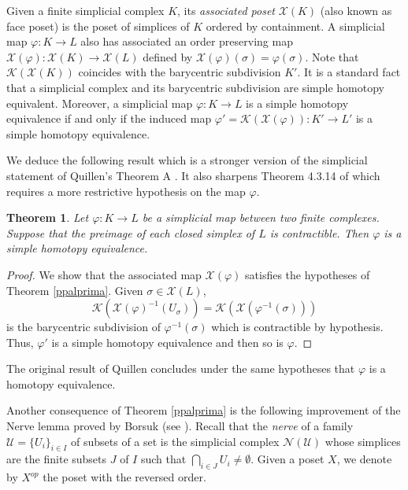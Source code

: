 \documentclass[11pt,twoside]{amsart}
\theoremstyle{plain}
\newtheorem{teo}[lema]{Theorem}
\theoremstyle{remark}
\theoremstyle{definition}
\newcommand{\kp}{\mathcal{K}}
\newcommand{\x}{\mathcal{X}}
\begin{document}

Given a finite simplicial complex $K$, its \textit{associated poset} $\x (K)$ (also known as face poset) is the poset of simplices of $K$ ordered by containment. A simplicial map $\varphi : K\to L$ also has associated an order preserving map $\x (\varphi): \x (K) \to \x (L)$ defined by $\x (\varphi) (\sigma)=\varphi (\sigma)$. Note that $\kp (\x (K))$ coincides with the barycentric subdivision $K'$. It is a standard fact that a simplicial complex and its barycentric subdivision are simple homotopy equivalent. Moreover, a simplicial map $\varphi :K\to L$ is a simple homotopy equivalence if and only if the induced map $\varphi '=\kp (\x (\varphi)): K'\to L'$ is a simple homotopy equivalence.


We deduce the following result which is a stronger version of the simplicial statement of Quillen's Theorem A \cite{Qui2}. It also sharpens Theorem 4.3.14 of \cite{Bar3} which requires a more restrictive hypothesis on the map $\varphi$.

\begin{teo} \label{simplicialprima}
Let $\varphi : K \to L$ be a simplicial map between two finite complexes. Suppose that the preimage of each closed simplex of $L$ is contractible. Then $\varphi$ is a simple homotopy equivalence.
\end{teo}
\begin{proof}
We show that the associated map $\x (\varphi)$ satisfies the hypotheses of Theorem \ref{ppalprima}. Given $\sigma \in \x (L)$, $$\kp (\x (\varphi)^{-1}(U_\sigma))=\kp (\x(\varphi ^{-1}(\sigma)))$$ is the barycentric subdivision of $\varphi ^{-1}(\sigma)$ which is contractible by hypothesis. Thus, $\varphi '$ is a simple homotopy equivalence and then so is $\varphi$.
\end{proof}

The original result of Quillen concludes under the same hypotheses that $\varphi$ is a homotopy equivalence. 

Another consequence of Theorem \ref{ppalprima} is the following improvement of the Nerve lemma proved by Borsuk (see \cite[Theorem 10.6]{Bjo}). Recall that the \textit{nerve} of a family $\mathcal{U}=\{U_i\}_{i\in I}$ of subsets of a set is the simplicial complex $\mathcal{N}(\mathcal{U})$ whose simplices are the finite subsets $J$ of $I$ such that $\bigcap\limits_{i\in J}U_i\neq \emptyset$. Given a poset $X$, we denote by $X^{op}$ the poset with the reversed order. 
\end{document}
